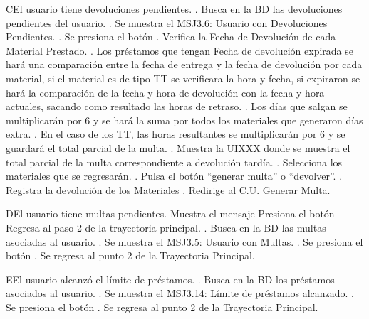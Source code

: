 		\begin{UCtrayectoriaA}{C}{El usuario tiene devoluciones pendientes.}
			.	Busca en la BD las devoluciones pendientes del usuario. 
			.	Se muestra el MSJ3.6: Usuario con Devoluciones Pendientes.
			. Se presiona el botón 
			.	Verifica la Fecha de Devolución de cada Material Prestado.
			.	Los préstamos que tengan Fecha de devolución expirada se hará una comparación entre la fecha de entrega y la fecha de devolución por cada material, si el material es de tipo TT se verificara la hora y fecha, si expiraron se hará la comparación de la fecha y hora de devolución con la fecha y hora actuales, sacando como resultado las horas de retraso.
			.	Los días que salgan se multiplicarán por 6 y se hará la suma por todos los materiales que generaron días extra.
			.	En el caso de los TT, las horas resultantes se multiplicarán por 6 y se guardará el total parcial de la multa.
			.	Muestra la UIXXX donde se muestra el total parcial de la multa correspondiente a devolución tardía.
			.	Selecciona los materiales que se regresarán.
			.	Pulsa el botón “generar multa” o “devolver”.
			.	Registra la devolución de los Materiales
			.	Redirige al C.U. Generar Multa.
		\end{UCtrayectoriaA}	
		\begin{UCtrayectoriaA}{D}{El usuario tiene multas pendientes.}
			\UCpaso[\UCsist] Muestra el mensaje 
			\UCpaso[\UCactor] Presiona el botón 
			\UCpaso[\UCsist] Regresa al paso 2 de la trayectoria principal.
			.	Busca en la BD las multas asociadas al usuario.
			.	Se muestra el MSJ3.5: Usuario con Multas.
			. Se presiona el botón 
			.	Se regresa al punto 2 de la Trayectoria Principal.
		\end{UCtrayectoriaA}
		\begin{UCtrayectoriaA}{E}{El usuario alcanzó el límite de préstamos.}
			.	Busca en la BD los préstamos asociados al usuario.
			.	Se muestra el MSJ3.14: Límite de préstamos alcanzado.
			. Se presiona el botón 
			.	Se regresa al punto 2 de la Trayectoria Principal.
		\end{UCtrayectoriaA}
